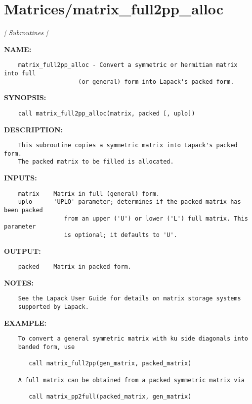 \section{Matrices/matrix\_full2pp\_alloc}
\textsl{[ Subroutines ]}

\label{ch:robo21}
\label{ch:Matrices_matrix_full2pp_alloc}
\textbf{NAME:}\hspace{0.08in}\begin{Verbatim}
    matrix_full2pp_alloc - Convert a symmetric or hermitian matrix into full
                     (or general) form into Lapack's packed form.
\end{Verbatim}
\textbf{SYNOPSIS:}\hspace{0.08in}\begin{Verbatim}
    call matrix_full2pp_alloc(matrix, packed [, uplo])
\end{Verbatim}
\textbf{DESCRIPTION:}\hspace{0.08in}\begin{Verbatim}
    This subroutine copies a symmetric matrix into Lapack's packed form.
    The packed matrix to be filled is allocated.
\end{Verbatim}
\textbf{INPUTS:}\hspace{0.08in}\begin{Verbatim}
    matrix    Matrix in full (general) form.
    uplo      'UPLO' parameter; determines if the packed matrix has been packed
                 from an upper ('U') or lower ('L') full matrix. This parameter
                 is optional; it defaults to 'U'.
\end{Verbatim}
\textbf{OUTPUT:}\hspace{0.08in}\begin{Verbatim}
    packed    Matrix in packed form.
\end{Verbatim}
\textbf{NOTES:}\hspace{0.08in}\begin{Verbatim}
    See the Lapack User Guide for details on matrix storage systems
    supported by Lapack. 
\end{Verbatim}
\textbf{EXAMPLE:}\hspace{0.08in}\begin{Verbatim}
    To convert a general symmetric matrix with ku side diagonals into 
    banded form, use

       call matrix_full2pp(gen_matrix, packed_matrix)

    A full matrix can be obtained from a packed symmetric matrix via

       call matrix_pp2full(packed_matrix, gen_matrix)
\end{Verbatim}
